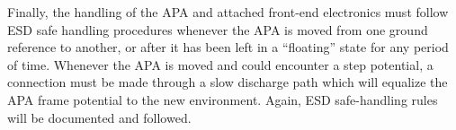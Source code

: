 Finally, the handling of the APA and attached front-end electronics must follow ESD safe handling procedures whenever the APA is moved from one ground reference to another, or after it has been left in a ``floating'' state for any period of time.  Whenever the APA is moved and could encounter a step potential, a connection must be made through a slow discharge path which will equalize the APA frame potential to the new environment.  Again, ESD safe-handling rules will be documented and followed.
